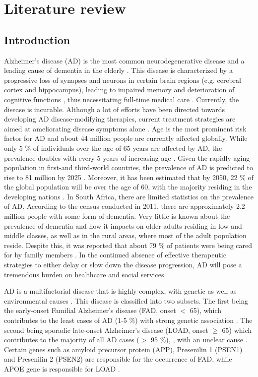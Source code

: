 \chapter{Literature review}
\section{Introduction}
Alzheimer’s disease (AD) is the most common neurodegenerative disease and a leading cause of dementia in the elderly \citep{andrieu2015}. This disease is characterized by a progressive loss of synapses and neurons in certain brain regions (e.g. cerebral cortex and hippocampus), leading to impaired memory and deterioration of cognitive functions \citep{dekosky1990,scheff2006,zare-shahabadi2015}, thus necessitating full-time medical care \citep{prince2013}. Currently, the disease is incurable. Although a lot of efforts have been directed towards developing AD disease-modifying therapies, current treatment strategies are aimed at ameliorating disease symptoms alone \citep{anand2014,disanto2013}. Age is the most prominent risk factor for AD and about 44 million people are currently affected globally. While only 5 \% of individuals over the age of 65 years are affected by AD, the prevalence doubles with every 5 years of increasing age \citep{pimenova2018,qiu2009}. Given the rapidly aging population in first-and third-world countries, the prevalence of AD is predicted to rise to 81 million by 2025 \citep{AlzheimersAssociation2014,Ferri2005}. Moreover, it has been estimated that by 2050, 22 \% of the global population will be over the age of 60, with the majority residing in the developing nations \citep{Annear2015,Paddick2013}. In South Africa, there are limited statistics on the prevalence of AD. According to the census conducted in 2011, there are approximately 2.2 million people with some form of dementia. Very little is known about the prevalence of dementia and how it impacts on older adults residing in low and middle classes, as well as in the rural areas, where most of the adult population reside. Despite this, it was reported that about 79 \% of patients were being cared for by family members \citep{Kalula2010}. In the continued absence of effective therapeutic strategies to either delay or slow down the disease progression, AD will pose a tremendous burden on healthcare and social services. 

AD is a multifactorial disease that is highly complex, with genetic as well as environmental causes \citep{Dorszewska2016}. This disease is classified into two subsets. The first being the early-onset Familial Alzheimer’s disease (FAD, onset $<$ 65), which contributes to the least cases of AD (1-5 \%) with strong genetic association \citep{Musiek2015,Reitz2014,Swerdlow2007}. The second being sporadic late-onset Alzheimer’s disease (LOAD, onset $\geq$ 65) which contributes to the majority of all AD cases ($>$ 95 \%), \citep{Musiek2015,Reitz2014,Swerdlow2007}, with an unclear cause \citep{Dorszewska2016,pimenova2018}. Certain genes such as amyloid precursor protein (APP), Presenilin 1 (PSEN1) and Presenilin 2  (PSEN2) are responsible for the occurrence of FAD, while APOE gene is responsible for LOAD \citep{Dorszewska2016}.

